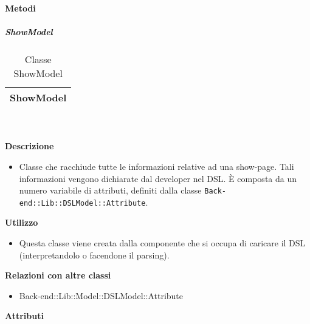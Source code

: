 		\textbf{Metodi} 
	\begin{itemize}
		\end{itemize}
			\subparagraph{ShowModel} 
\begin{table}[ht]
\begin{center}
\bgroup
	\setlength{\arrayrulewidth}{0.6mm}
	\def\arraystretch{1}
		\begin{tabular}{ | p{12cm} | }
				\hline  
					\centerline{\textbf{ShowModel}}
		\\ \hline 
				\hline
				\hline
		
		\end{tabular}
\egroup
\caption{Classe ShowModel}
\end{center}
\end{table}  \textbf{\\ \\ Descrizione} 
					\begin{itemize}
						\item[] Classe che racchiude tutte le informazioni relative ad una show-page. Tali informazioni vengono dichiarate dal developer nel DSL. È composta da un numero variabile di attributi, definiti dalla classe \texttt{Back-end::Lib::DSLModel::Attribute}.
					\end{itemize}      
				\textbf{Utilizzo}  
					\begin{itemize}
						\item[] Questa classe viene creata dalla componente che si occupa di caricare il DSL (interpretandolo o facendone il parsing).
					\end{itemize}
					\textbf{Relazioni con altre classi}
					\begin{itemize}
							\item{Back-end::Lib::Model::DSLModel::Attribute}
					\end{itemize}
			 \textbf{Attributi} 
	\begin{itemize}
		\end{itemize}
		
